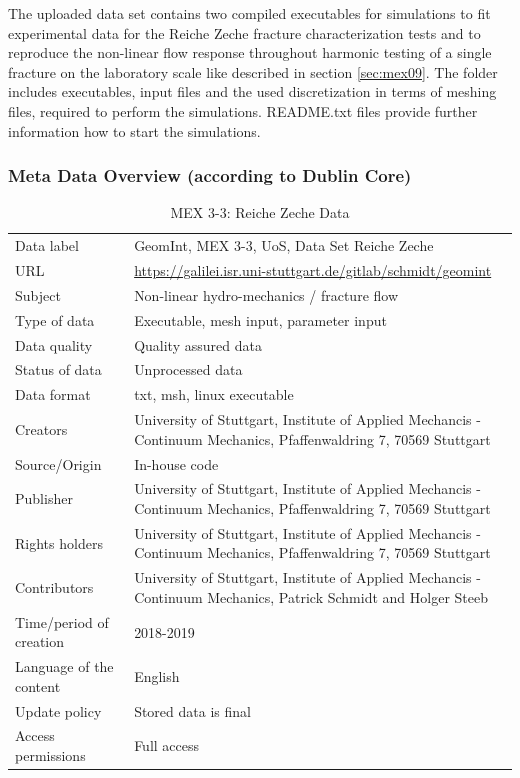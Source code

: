The uploaded data set contains two compiled executables for simulations to fit experimental data for the Reiche Zeche fracture characterization tests and to reproduce the non-linear flow response throughout harmonic testing of a single fracture on the laboratory scale like described in section \ref{sec:mex09}. The folder includes executables, input files and the used discretization in terms of meshing files, required to perform the simulations. README.txt files provide further information how to start the simulations.

\clearpage
\subsubsection*{Meta Data Overview (according to Dublin Core)}

\begin{table}[!ht]
\caption{MEX 3-3: Reiche Zeche Data}
\label{tab:dms-mex3-3}
\small
\begin{tabular}{R{3cm}|L{7cm}}
\hline
%
Data label & GeomInt, MEX 3-3, UoS, Data Set Reiche Zeche \\
URL &  \url{https://galilei.isr.uni-stuttgart.de/gitlab/schmidt/geomint} \\
Subject  &  Non-linear hydro-mechanics / fracture flow\\
Type of data  &  Executable, mesh input, parameter input\\
Data quality  &  Quality assured data \\
Status of data  &  Unprocessed data\\
Data format  & txt, msh, linux executable\\
Creators  &  University of Stuttgart, Institute of Applied Mechancis - Continuum Mechanics, Pfaffenwaldring 7, 70569 Stuttgart\\
Source/Origin & In-house code \\
Publisher  &  University of Stuttgart, Institute of Applied Mechancis - Continuum Mechanics, Pfaffenwaldring 7, 70569 Stuttgart \\
Rights holders & University of Stuttgart, Institute of Applied Mechancis - Continuum Mechanics, Pfaffenwaldring 7, 70569 Stuttgart \\
Contributors &  University of Stuttgart, Institute of Applied Mechancis - Continuum Mechanics, Patrick Schmidt and Holger Steeb\\
Time/period of creation &  2018-2019\\
Language of the content &  English\\
Update policy &  Stored data is final\\
Access permissions &  Full access\\
%
\hline
\end{tabular}
\end{table}